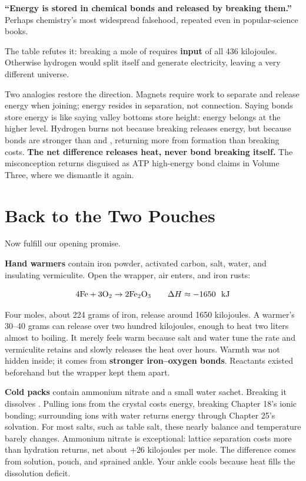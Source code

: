 \begin{wuqu}
\textbf{``Energy is stored in chemical bonds and released by breaking them.''} Perhaps chemistry's most widespread falsehood, repeated even in popular-science books.

The table refutes it: breaking a mole of  requires \textbf{input} of all 436 kilojoules. Otherwise hydrogen would split itself and generate electricity, leaving a very different universe.

Two analogies restore the direction. Magnets require work to separate and release energy when joining; energy resides in separation, not connection. Saying bonds store energy is like saying valley bottoms store height: energy belongs at the higher level. Hydrogen burns not because breaking releases energy, but because  bonds are stronger than  and , returning more from formation than breaking costs. \textbf{The net difference releases heat, never bond breaking itself.} The misconception returns disguised as ATP high-energy bond claims in Volume Three, where we dismantle it again.
\end{wuqu}

\section{Back to the Two Pouches}

Now fulfill our opening promise.

\textbf{Hand warmers} contain iron powder, activated carbon, salt, water, and insulating vermiculite. Open the wrapper, air enters, and iron rusts:

\[ \mathrm{4Fe} + \mathrm{3O_2} \rightarrow \mathrm{2Fe_2O_3} \qquad \Delta H \approx -1650\ \ \mathrm{kJ} \]

Four moles, about 224 grams of iron, release around 1650 kilojoules. A warmer's 30--40 grams can release over two hundred kilojoules, enough to heat two liters almost to boiling. It merely feels warm because salt and water tune the rate and vermiculite retains and slowly releases the heat over hours. Warmth was not hidden inside; it comes from \textbf{stronger iron--oxygen bonds}. Reactants existed beforehand but the wrapper kept them apart.

\textbf{Cold packs} contain ammonium nitrate and a small water sachet. Breaking it dissolves . Pulling ions from the crystal costs energy, breaking Chapter 18's ionic bonding; surrounding ions with water returns energy through Chapter 25's solvation. For most salts, such as table salt, these nearly balance and temperature barely changes. Ammonium nitrate is exceptional: lattice separation costs more than hydration returns, net about $+26$ kilojoules per mole. The difference comes from solution, pouch, and sprained ankle. Your ankle cools because heat fills the dissolution deficit.

